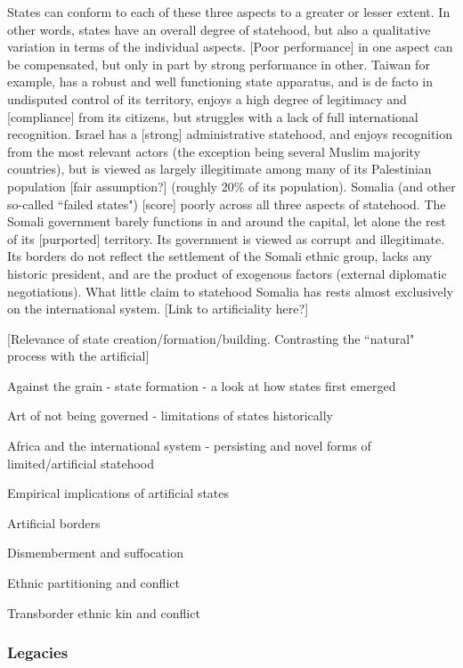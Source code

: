 \documentclass[12pt]{article}
\begin{document}
States can conform to each of these three aspects to a greater or lesser extent.
In other words, states have an overall degree of statehood, but also a
qualitative variation in terms of the individual aspects. [Poor performance] in
one aspect can be compensated, but only in part by strong performance in other.
Taiwan for example, has a robust and well functioning state apparatus, and is de
facto in undisputed control of its territory, enjoys a high degree of legitimacy
and [compliance] from its citizens, but struggles with a lack of full
international recognition. Israel has a [strong] administrative statehood, and
enjoys recognition from the most relevant actors (the exception being several
Muslim majority countries), but is viewed as largely illegitimate among many of
its Palestinian population [fair assumption?] (roughly 20\% of its population).
Somalia (and other so-called ``failed states") [score] poorly across all three
aspects of statehood. The Somali government barely functions in and around the
capital, let alone the rest of its [purported] territory. Its government is
viewed as corrupt and illegitimate. Its borders do not reflect the settlement of
the Somali ethnic group, lacks any historic president, and are the product of
exogenous factors (external diplomatic negotiations). What little claim to
statehood Somalia has rests almost exclusively on the international system.
[Link to artificiality here?]

[Relevance of state creation/formation/building. Contrasting the ``natural"
process with the artificial]

\citet{scott2017against} Against the grain - state formation - a look at how
states first emerged

\citet{Scott2009} Art of not being governed - limitations of states historically

\citet{Clapham1996} Africa and the international system - persisting and novel
forms of limited/artificial statehood

Empirical implications of artificial states

\citet{Alesina2011} Artificial borders

\citet{Englebert2002} Dismemberment and suffocation

\citet{Ito2020} Ethnic partitioning and conflict

\citet{Cederman2013, Salehyan2009, Weidmann2015} Transborder ethnic kin and
conflict


\subsubsection{Legacies} \label{Legacies} 
\end{document}
